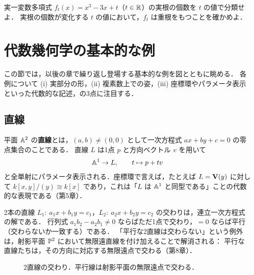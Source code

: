 実一変数多項式 $f_t(x)=x^3-3x+t$（$t\in\mathbb{R}$）の実根の個数を $t$ の値で分類せよ．
実根の個数が変化する $t$ の値において，$f_t$ は重根をもつことを確かめよ．

\section{代数幾何学の基本的な例}

この節では，以後の章で繰り返し登場する基本的な例を図とともに眺める．
各例について (i) 実部分の形，(ii) 複素数上での姿，(iii) 座標環やパラメータ表示といった代数的な記述，の3点に注目する．

\subsection{直線}

平面 $\mathbb{A}^2$ の\textbf{直線}とは，$(a,b)\ne(0,0)$ として一次方程式 $ax+by+c=0$ の零点集合のことである．
直線 $L$ は1点 $p$ と方向ベクトル $v$ を用いて
\[
  \mathbb{A}^1\to L,\qquad t\mapsto p+tv
\]
と全単射にパラメータ表示される．座標環で言えば，たとえば $L=\mathbf{V}(y)$ に対して
$k[x,y]/(y)\cong k[x]$ であり，これは「$L$ は $\mathbb{A}^1$ と同型である」ことの代数的な表現である（第5章）．

2本の直線 $L_1:\ a_1x+b_1y=c_1$，$L_2:\ a_2x+b_2y=c_2$ の交わりは，連立一次方程式の解である．
行列式 $a_1b_2-a_2b_1\ne0$ ならばただ1点で交わり，$=0$ ならば平行（交わらないか一致する）である．
「平行な2直線は交わらない」という例外は，射影平面 $\mathbb{P}^2$ において無限遠直線を付け加えることで解消される：
平行な直線たちは，その方向に対応する無限遠点で交わる（第8章）．

\begin{figure}[H]
\centering
{}
\caption{2直線の交わり．平行線は射影平面の無限遠点で交わる．}
\label{fig:ch01-lines}
\end{figure}

